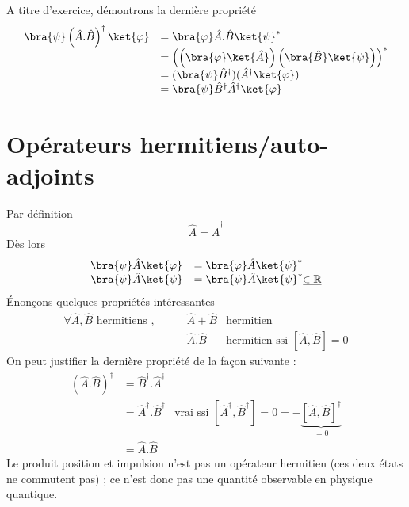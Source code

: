 A titre d'exercice, démontrons la dernière propriété
\begin{equation}
\begin{array}{ll}
\bra{\psi}\left(\hat{A}.\hat{B}\right)^\dagger\ket{\varphi} &= \bra{\varphi}\hat{A}.
\hat{B}\ket{\psi}^*\\
&= \left(\left(\bra{\varphi}\ket{\hat{A}}\right)\left(\bra{\hat{B}}\ket{\psi}\right)\right)^*\\
&= (\bra{\psi}\hat{B}^\dagger)(\hat{A}^\dagger\ket{\varphi})\\
&= \bra{\psi}\hat{B}^\dagger\hat{A}^\dagger\ket{\varphi}
\end{array}
\end{equation}

\section{Opérateurs hermitiens/auto-adjoints}
Par définition
\begin{equation}
\hat{A} = \hat{A}^\dagger
\end{equation}
Dès lors
\begin{equation}
\begin{array}{ll}
\bra{\psi}\hat{A}\ket{\varphi} &= \bra{\varphi}\hat{A}\ket{\psi}^*\\
\bra{\psi}\hat{A}\ket{\psi} &= \bra{\psi}\hat{A}\ket{\psi}^* \underline{\in \mathbb{R}}
\end{array}
\end{equation}
Énonçons quelques propriétés intéressantes
\begin{equation}
\begin{array}{lll}
\forall \hat{A},\hat{B} \text{ hermitiens },\qquad & \hat{A}+\hat{B} & \text{hermitien}\\
& \hat{A}.\hat{B} & \text{hermitien ssi } [\hat{A},\hat{B}] = 0
\end{array}
\end{equation}
On peut justifier la dernière propriété de la façon suivante :
\begin{equation}
\begin{array}{lll}
(\hat{A}.\hat{B})^\dagger &= \hat{B}^\dagger.\hat{A}^\dagger \\
&= \hat{A}^\dagger.\hat{B}^\dagger & \text{vrai ssi } [\hat{A}^\dagger,\hat{B}^\dagger]=0=-
\underbrace{[\hat{A},\hat{B}]^\dagger}_{=0}\\
&= \hat{A}.\hat{B}
\end{array}
\end{equation}
Le produit position et impulsion n'est pas un opérateur hermitien (ces deux états ne 
commutent pas) ; ce n'est donc pas une quantité observable en physique quantique.\\




